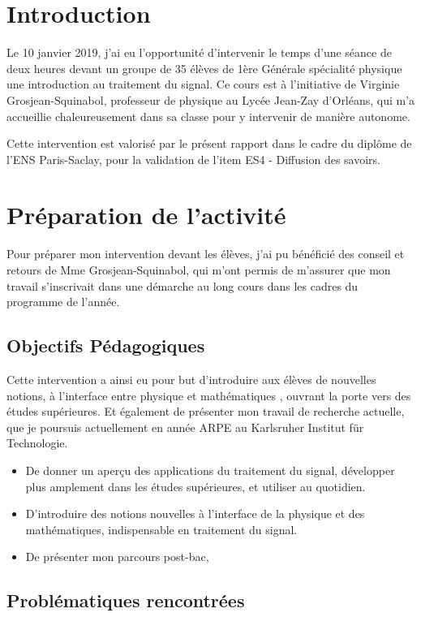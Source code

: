 \documentclass[12pt]{article}
\begin{document}
\section{Introduction}

Le 10 janvier 2019, j'ai eu l'opportunité d'intervenir le temps d'une séance de deux heures devant un groupe de 35 élèves de 1ère Générale spécialité physique une introduction au traitement du signal. Ce cours est à l'initiative de Virginie Grosjean-Squinabol, professeur de physique au Lycée Jean-Zay d'Orléans, qui m'a accueillie chaleureusement dans sa classe pour y intervenir de manière autonome.

Cette intervention est valorisé par le présent rapport dans le cadre du diplôme de l'ENS Paris-Saclay, pour la validation de l'item ES4 - Diffusion des savoirs.


\section{Préparation de l'activité}
Pour préparer mon intervention devant les élèves, j'ai pu bénéficié des conseil et retours de Mme Grosjean-Squinabol, qui m'ont permis de m'assurer que mon travail s'inscrivait dans une démarche au long cours dans les cadres du programme de l'année.
\subsection{Objectifs Pédagogiques}
Cette intervention a ainsi eu pour but d'introduire aux élèves de nouvelles notions, à l'interface entre physique et mathématiques , ouvrant la porte vers des études supérieures. Et également de présenter mon travail de recherche actuelle, que je poursuis actuellement en année ARPE au Karlsruher Institut für Technologie.
\begin{itemize}
  \item De donner un aperçu des applications du traitement du signal, développer plus amplement dans les études supérieures, et utiliser au quotidien.
  \item D'introduire des notions nouvelles à l'interface de la physique et des mathématiques, indispensable en traitement du signal.
  \item De présenter mon parcours post-bac,
\end{itemize}
\subsection{Problématiques rencontrées}
\end{document}
